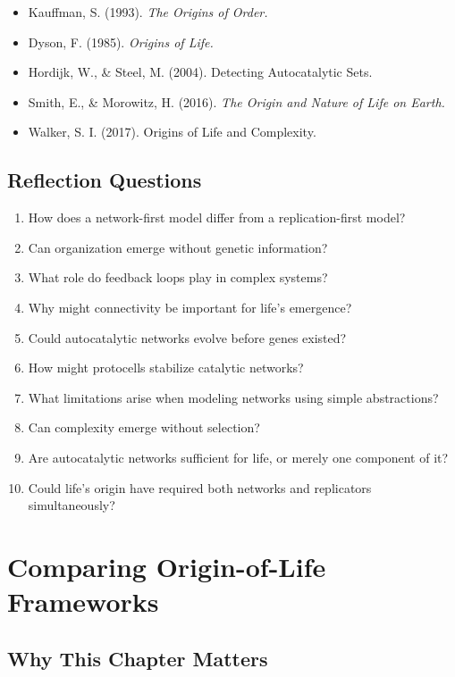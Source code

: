 \documentclass[
  oneside,
  openany]{book}
\providecommand{\tightlist}{%
  \setlength{\itemsep}{0pt}\setlength{\parskip}{0pt}}
\begin{document}
\begin{itemize}
\tightlist
\item
  Kauffman, S. (1993). \emph{The Origins of Order.}
\item
  Dyson, F. (1985). \emph{Origins of Life.}
\item
  Hordijk, W., \& Steel, M. (2004). Detecting Autocatalytic Sets.
\item
  Smith, E., \& Morowitz, H. (2016). \emph{The Origin and Nature of Life on Earth.}
\item
  Walker, S. I. (2017). Origins of Life and Complexity.
\end{itemize}

\section{Reflection Questions}\label{reflection-questions-5}

\begin{enumerate}
\def\labelenumi{\arabic{enumi}.}
\tightlist
\item
  How does a network-first model differ from a replication-first model?
\item
  Can organization emerge without genetic information?
\item
  What role do feedback loops play in complex systems?
\item
  Why might connectivity be important for life's emergence?
\item
  Could autocatalytic networks evolve before genes existed?
\item
  How might protocells stabilize catalytic networks?
\item
  What limitations arise when modeling networks using simple abstractions?
\item
  Can complexity emerge without selection?
\item
  Are autocatalytic networks sufficient for life, or merely one component of it?
\item
  Could life's origin have required both networks and replicators simultaneously?
\end{enumerate}

\chapter{Comparing Origin-of-Life Frameworks}\label{comparing-origin-of-life-frameworks}

\section{Why This Chapter Matters}\label{why-this-chapter-matters}
\end{document}
